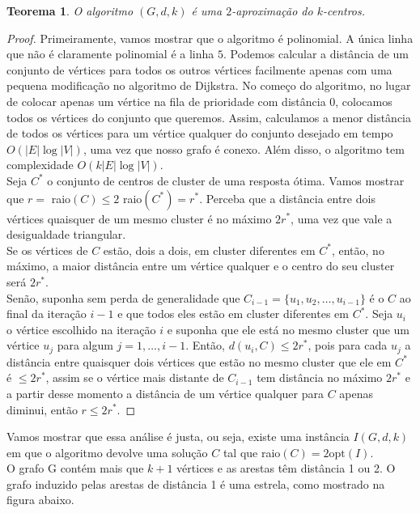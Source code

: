 \documentclass[12pt]{article}
\newcommand{\opt}{\ensuremath{\mathrm{opt}}}
\newtheorem{theorem}{Teorema}[section]
\begin{document}
    \begin{theorem}
        O algoritmo $(G,d,k)$ é uma $2$-aproximação do $k$-centros.
    \end{theorem}
    \begin{proof}
        Primeiramente, vamos mostrar que o algoritmo é polinomial. A única linha que não é claramente polinomial é a linha $5$. Podemos calcular a distância de um conjunto de vértices para todos os outros vértices facilmente apenas com uma pequena modificação no algoritmo de Dijkstra. No começo do algoritmo, no lugar de colocar apenas um vértice na fila de prioridade com distância 0, colocamos todos os vértices do conjunto que queremos. Assim, calculamos a menor distância de todos os vértices para um vértice qualquer do conjunto desejado em tempo $O(|E|\log|V|)$, uma vez que nosso grafo é conexo. Além disso, o algoritmo tem complexidade $O(k|E|\log|V| )$.\\
        Seja $C^*$ o conjunto de centros de cluster de uma resposta ótima. Vamos mostrar que $r=$ raio$(C) \leq 2$ raio$(C^*)=r^*$. Perceba que a distância entre dois vértices quaisquer de um mesmo cluster é no máximo $2r^*$, uma vez que vale a desigualdade triangular.\\ 
        Se os vértices de $C$ estão, dois a dois, em cluster diferentes em $C^*$, então, no máximo, a maior distância entre um vértice qualquer e o centro do seu cluster será $2r^*$. \\
        Senão, suponha sem perda de generalidade que $C_{i-1} = \{ u_1,u_2,\ldots,u_{i-1}\}$ é o $C$ ao final da iteração $i-1$ e que todos eles estão em cluster diferentes em $C^*$. Seja $u_i$ o vértice escolhido na iteração $i$ e suponha que ele está no mesmo cluster que um vértice $u_j$ para algum $j=1,\ldots,i-1$. Então, $d(u_i,C) \leq 2r^*$, pois para cada $u_j$ a distância entre quaisquer dois vértices que estão no mesmo cluster que ele em $C^*$ é $\leq 2r^*$, assim se o vértice mais distante de $C_{i-1}$ tem distância no máximo $2r^*$ e a partir desse momento a distância de um vértice qualquer para $C$ apenas diminui, então $r\leq 2r^*$.
    \end{proof}
    Vamos mostrar que essa análise é justa, ou seja, existe uma instância $I(G,d,k)$ em que o algoritmo devolve uma solução $C$ tal que raio$(C) = 2 \opt(I)$. \\
    O grafo G contém mais que $k+1$ vértices e as arestas têm distância 1 ou 2. O grafo induzido pelas arestas de distância 1 é uma estrela, como mostrado na figura abaixo.
\end{document}
